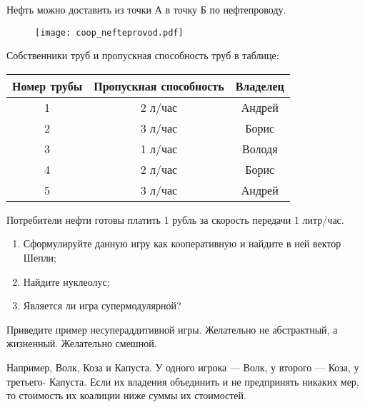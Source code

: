 \begin{problem}[Нефтепровод.]

Нефть можно доставить из точки А в точку Б по нефтепроводу.

\begin{figure}[!htbp]
	\texttt{[image: coop\_nefteprovod.pdf]}
\end{figure}

Собственники труб и пропускная способность труб в таблице:

\begin{tabular}{|c|c|c|}

\hline
Номер трубы & Пропускная способность & Владелец \\
\hline
1 & 2 л/час & Андрей \\
2 & 3 л/час & Борис \\
3 & 1 л/час & Володя \\
4 & 2 л/час & Борис \\
5 & 3 л/час & Андрей \\
\hline
\end{tabular}

Потребители нефти готовы платить 1 рубль за скорость передачи 1 литр/час.
\begin{enumerate}
\item Сформулируйте данную игру как кооперативную и найдите в ней  вектор Шепли;
\item Найдите нуклеолус;
\item Является ли игра супермодулярной?
\end{enumerate}



\begin{sol}

\end{sol}
\end{problem}






\begin{problem}
Приведите пример несупераддитивной игры. Желательно не абстрактный, а жизненный. Желательно смешной.



\begin{sol}
Например, Волк, Коза и Капуста. У одного игрока --- Волк, у второго --- Коза, у третьего- Капуста. Если их владения объединить и не предпринять никаких мер, то стоимость их коалиции ниже суммы их стоимостей.
\end{sol}
\end{problem}





